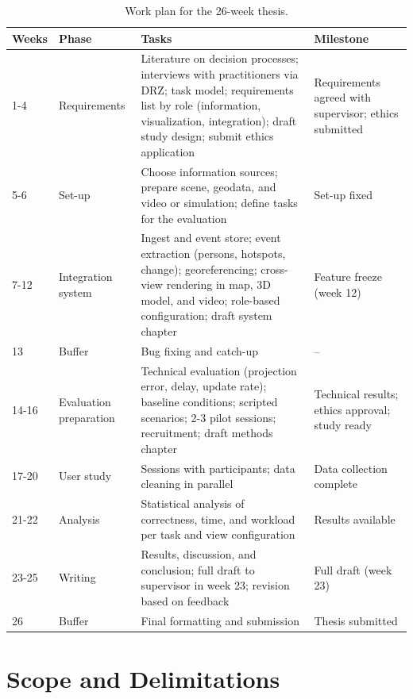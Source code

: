 \documentclass{article}
\begin{document}
\begin{table}[h]
\centering
\small
\renewcommand{\arraystretch}{1.3}
\begin{tabularx}{\textwidth}{@{}l>{\raggedright\arraybackslash}p{2.3cm}>{\raggedright\arraybackslash}X>{\raggedright\arraybackslash}p{3.2cm}@{}}
\toprule
\textbf{Weeks} & \textbf{Phase} & \textbf{Tasks} & \textbf{Milestone} \\
\midrule
1-4 & Requirements & Literature on decision processes; interviews with practitioners via DRZ; task model; requirements list by role (information, visualization, integration); draft study design; submit ethics application & Requirements agreed with supervisor; ethics submitted \\
5-6 & Set-up & Choose information sources; prepare scene, geodata, and video or simulation; define tasks for the evaluation & Set-up fixed \\
7-12 & Integration system & Ingest and event store; event extraction (persons, hotspots, change); georeferencing; cross-view rendering in map, 3D model, and video; role-based configuration; draft system chapter & Feature freeze (week 12) \\
13 & Buffer & Bug fixing and catch-up & -- \\
14-16 & Evaluation preparation & Technical evaluation (projection error, delay, update rate); baseline conditions; scripted scenarios; 2-3 pilot sessions; recruitment; draft methods chapter & Technical results; ethics approval; study ready \\
17-20 & User study & Sessions with participants; data cleaning in parallel & Data collection complete \\
21-22 & Analysis & Statistical analysis of correctness, time, and workload per task and view configuration & Results available \\
23-25 & Writing & Results, discussion, and conclusion; full draft to supervisor in week 23; revision based on feedback & Full draft (week 23) \\
26 & Buffer & Final formatting and submission & Thesis submitted \\
\bottomrule
\end{tabularx}
\caption{Work plan for the 26-week thesis.}
\label{tab:workplan}
\end{table}

\section{Scope and Delimitations}
\end{document}
